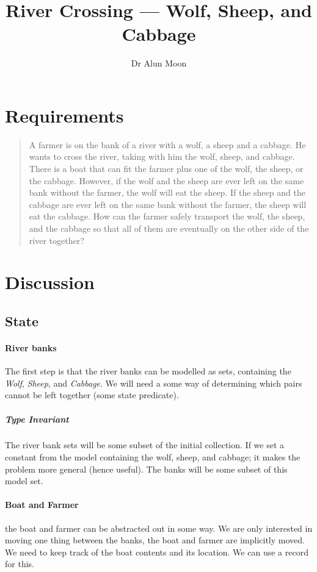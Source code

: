 \documentclass{article}
\title{River Crossing --- Wolf, Sheep, and Cabbage}
\author{Dr Alun Moon}
\begin{document}
\maketitle

\section{Requirements}
\begin{quote}
A farmer is on the bank of a river with a wolf, a sheep and a cabbage. He wants to cross the river, taking with him the wolf, sheep, and cabbage. There is a boat that can fit the farmer plus one of the wolf, the sheep, or the cabbage. However, if the wolf and the sheep are ever left on the same bank without the farmer, the wolf will eat the sheep. If the sheep and the cabbage are ever left on the same bank without the farmer, the sheep will eat the cabbage. How can the farmer safely transport the wolf, the sheep, and the cabbage so that all of them are eventually on the other side of the river together?
\end{quote}

\section{Discussion}
\subsection{State}
\paragraph{River banks}  The first step is that the river banks can be modelled
as sets, containing the \emph{Wolf}, \emph{Sheep}, and \emph{Cabbage}.  We
will need a some way of determining which pairs cannot be left together (some
state predicate).  

\subparagraph{Type Invariant}  The river bank sets will be some subset of the
initial collection.  If we set a constant from the model containing the wolf,
sheep, and cabbage; it makes the problem more general (hence useful).  The
banks will be some subset of this model set.

\paragraph{Boat and Farmer} the boat and farmer can be abstracted out in some
way.  We are only interested in moving one thing between the banks, the boat
and farmer are implicitly moved.  We need to keep track of the boat contents
and its location.  We can use a record for this.
\end{document}
